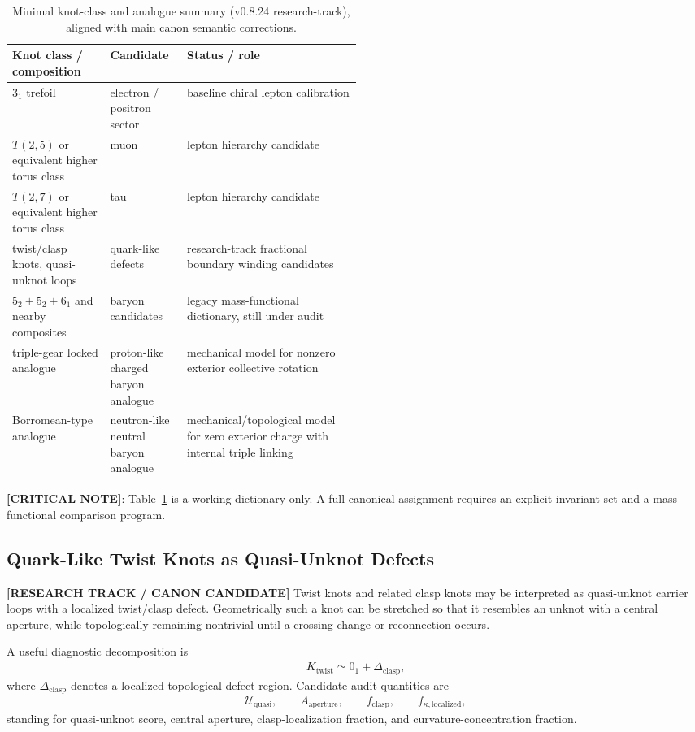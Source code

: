 \begin{table}[h]
\centering
\begin{tabularx}{\linewidth}{p{0.28\linewidth}p{0.22\linewidth}X}
\hline
Knot class / composition & Candidate & Status / role \\
\hline
$3_1$ trefoil & electron / positron sector & baseline chiral lepton calibration \\
$T(2,5)$ or equivalent higher torus class & muon & lepton hierarchy candidate \\
$T(2,7)$ or equivalent higher torus class & tau & lepton hierarchy candidate \\
twist/clasp knots, quasi-unknot loops & quark-like defects & research-track fractional boundary winding candidates \\
$5_2+5_2+6_1$ and nearby composites & baryon candidates & legacy mass-functional dictionary, still under audit \\
triple-gear locked analogue & proton-like charged baryon analogue & mechanical model for nonzero exterior collective rotation \\
Borromean-type analogue & neutron-like neutral baryon analogue & mechanical/topological model for zero exterior charge with internal triple linking \\
\hline
\end{tabularx}
\caption{Minimal knot-class and analogue summary (v0.8.24 research-track), aligned with main canon semantic corrections.}
\label{tab:particle-candidates}
\end{table}

\textbf{[CRITICAL NOTE]}: Table~\ref{tab:particle-candidates} is a working dictionary only. A full canonical assignment requires an explicit invariant set and a mass-functional comparison program.


\subsection{Quark-Like Twist Knots as Quasi-Unknot Defects}
\label{subsec:rt_quark_twist_quasi_unknot}

\textbf{[RESEARCH TRACK / CANON CANDIDATE]} Twist knots and related clasp knots may be interpreted as quasi-unknot carrier loops with a localized twist/clasp defect. Geometrically such a knot can be stretched so that it resembles an unknot with a central aperture, while topologically remaining nontrivial until a crossing change or reconnection occurs.

A useful diagnostic decomposition is
\begin{align}
    K_{\mathrm{twist}}
    \simeq
    0_1 + \Delta_{\mathrm{clasp}},
\end{align}
where $\Delta_{\mathrm{clasp}}$ denotes a localized topological defect region. Candidate audit quantities are
\begin{align}
    \mathcal{U}_{\mathrm{quasi}},\qquad
    A_{\mathrm{aperture}},\qquad
    f_{\mathrm{clasp}},\qquad
    f_{\kappa,\mathrm{localized}},
\end{align}
standing for quasi-unknot score, central aperture, clasp-localization fraction, and curvature-concentration fraction.

